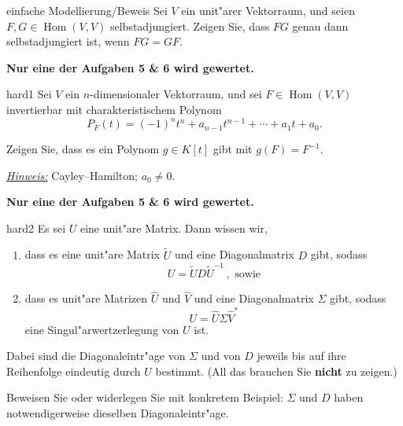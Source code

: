 \documentclass[a4paper]{article}
\DeclareMathOperator{\Hom}{Hom}
\begin{document}
\pagebreak
\begin{klaufg}{8}{einfache Modellierung/Beweis}
  Sei $V$ ein unit"arer Vektorraum, und seien $F,G \in
  \Hom(V,V)$ selbstadjungiert. Zeigen Sie, dass $FG$ genau dann
  selbstadjungiert ist, wenn $FG=GF$.
\end{klaufg}
 
\pagebreak
{\bfseries Nur eine der Aufgaben 5 \& 6 wird gewertet.}
\bigskip
\bigskip

\begin{klaufg}{8}{hard1}
   Sei $V$ ein $n$-dimensionaler Vektorraum, und sei $F \in
   \operatorname{Hom}(V,V)$ invertierbar mit charakteristischem
   Polynom $$P_F(t) = (-1)^n t^n + a_{n-1} t^{n-1} + \cdots + a_1 t +
   a_0 .$$

   Zeigen Sie, dass es ein Polynom $g \in K[t]$ gibt mit $g(F)= F^{-1}$.
   \medskip

   \underline{\emph{Hinweis:}} Cayley--Hamilton; $a_0 \neq 0$.  
\end{klaufg}

\pagebreak
{\bfseries Nur eine der Aufgaben 5 \& 6 wird gewertet.}
\bigskip
\bigskip

\begin{klaufg}{8}{hard2}
  Es sei $U$ eine unit"are Matrix. Dann wissen wir, 
  \begin{enumerate}
  \item dass es eine unit"are Matrix $\tilde{U}$ und eine Diagonalmatrix
    $D$ gibt, sodass
    \[ U = \tilde{U} D \tilde{U}^{-1}\,, \text{ sowie}
    \]
  \item dass
    es unit"are Matrizen $\widehat{U}$ und $\widehat{V}$ und eine
    Diagonalmatrix $\Sigma$ gibt, sodass
    \[ U = \widehat{U} \Sigma \widehat{V}^*
    \]
    eine Singul"arwertzerlegung von $U$ ist.
  \end{enumerate}
  Dabei sind die Diagonaleintr"age von $\Sigma$ und von $D$ jeweils
  bis auf ihre Reihenfolge eindeutig durch $U$ bestimmt. (All das
  brauchen Sie {\bfseries nicht} zu zeigen.)

  Beweisen Sie oder widerlegen Sie mit konkretem Beispiel: $\Sigma$ und
  $D$ haben notwendigerweise dieselben Diagonaleintr"age.
\end{klaufg}
\end{document}
